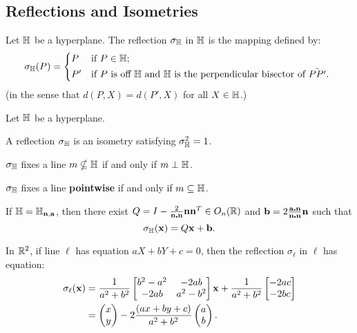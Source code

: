 \subsection{Reflections and Isometries}

\begin{definition}
    Let \(\mathbb{H}\) be a hyperplane. The reflection \(\sigma_{\mathbb{H}}\) in \(\mathbb{H}\) is the mapping defined by:
    \[\sigma_\bH (P) =
        \begin{cases*}
            P & if \(P \in \bH\); \\
            P' & if \(P\) is off \(\bH\) and \(\bH\) is the perpendicular bisector of \(\bar{PP'}\).
        \end{cases*}
    \]
    (in the sense that \(d(P, X) = d(P', X)\) for all \(X \in \mathbb{H}\).)
\end{definition}

\begin{proposition}
    Let \(\mathbb{H}\) be a hyperplane.
    \begin{statements}{}
        \item A reflection \(\sigma_{\mathbb{H}}\) is an isometry satisfying \(\sigma_{\mathbb{H}}^2 = 1\).
        \item \(\sigma_{\mathbb{H}}\) fixes a line \(m \nsubseteq \mathbb{H}\) if and only if \(m \perp \mathbb{H}\).
        \item \(\sigma_{\mathbb{H}}\) fixes a line \textbf{pointwise} if and only if \(m \subseteq \mathbb{H}\).
    \end{statements}
\end{proposition}

\begin{theorem}
    If \(\mathbb{H} = \mathbb{H}_{\mathbf{n, a}}\), then there exist \(Q = I - \frac{2}{\mathbf{n \centerdot n}}\mathbf{n n}^T \in O_n(\mathbb{R})\) and \(\mathbf{b} = 2 \frac{\mathbf{a \centerdot n}}{\mathbf{n \centerdot n}}\mathbf{n}\) such that
    \[\sigma_{\mathbb{H}} (\mathbf{x}) = Q\mathbf{x} + \mathbf{b}.\]
\end{theorem}

\begin{corollary}
    In \(\mathbb{R}^2\), if line \(\ell\) has equation \(aX + bY + c = 0\), then the reflection \(\sigma_\ell\) in \(\ell\) has equation:
    \begin{align*}
        \sigma_\ell(\mathbf{x}) & = \frac{1}{a^2 + b^2}\begin{bmatrix}
            b^2 - a^2 & -2ab      \\
            -2ab      & a^2 - b^2
        \end{bmatrix} \mathbf{x} + \frac{1}{a^2 + b^2} \begin{bmatrix}
            -2ac \\ -2bc
        \end{bmatrix} \\
                         & = \begin{pmatrix}
            x \\ y
        \end{pmatrix} - 2 \frac{(ax + by + c)}{a^2 + b^2} \begin{pmatrix}
            a \\ b
        \end{pmatrix}.
    \end{align*}
\end{corollary}


